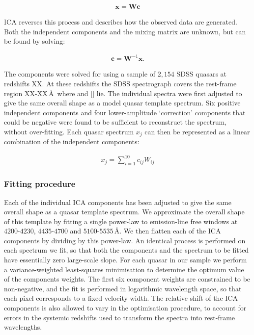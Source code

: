 \begingroup\makeatletter{}\check@mathfonts
\begin{eqnarray}
    \bm{x} = \bm{W}\bm{c}
\end{eqnarray}
\endgroup

\noindent ICA reverses this process and describes how the observed data are generated. 
Both the independent components and the mixing matrix are unknown, but can be found by solving:

\begingroup\makeatletter{}\check@mathfonts
\begin{eqnarray}
    \bm{c} = \bm{W}^{-1}\bm{x}.
\end{eqnarray}
\endgroup

\noindent The components were solved for using a sample of $2,154$ SDSS quasars at redshifts XX. 
At these redshifts the SDSS spectrograph covers the rest-frame region XX-XX\,\AA\, where \hb and [] lie. 
The individual spectra were first adjusted to give the same overall shape as a model quasar template spectrum.
Six positive independent components and four lower-amplitude `correction' components that could be negative were found to be sufficient to reconstruct the spectrum, without over-fitting. 
Each quasar spectrum $x_j$ can then be represented as a linear combination of the independent components: 

\begingroup\makeatletter{}\check@mathfonts
\begin{eqnarray}
    x_j = \sum_{i=1}^{10} c_{ij}W_{ij}
\end{eqnarray}
\endgroup

\subsubsection{Fitting procedure}

Each of the individual ICA components has been adjusted to give the same overall shape as a quasar template spectrum. 
We approximate the overall shape of this template by fitting a single power-law to emission-line free windows at $4200$-$4230$, $4435$-$4700$ and $5100$-$5535$\,\AA. 
We then flatten each of the ICA components by dividing by this power-law. 
An identical process is performed on each spectrum we fit, so that both the components and the spectrum to be fitted have essentially zero large-scale slope. 
For each quasar in our sample we perform a variance-weighted least-squares minimisation to determine the optimum value of the components weights.
The first six component weights are constrained to be non-negative, and the fit is performed in logarithmic wavelength space, so that each pixel corresponds to a fixed velocity width.   
The relative shift of the ICA components is also allowed to vary in the optimisation procedure, to account for errors in the systemic redshifts used to transform the spectra into rest-frame wavelengths. 

